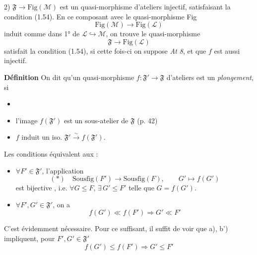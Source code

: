 \documentclass[11pt,a4paper]{article}
\begin{document}
2) $\boxed{\mathfrak{F} \to \mathrm{Fig}(\mathcal{M})}$ est un quasi-morphisme d'ateliers injectif, satisfaisant la condition  (1.54). \add{\ill{}} En ce composant avec le quasi-morphisme Fig
\[
  \mathrm{Fig}(\mathcal{M}) \longrightarrow \mathrm{Fig}(\mathcal{L})
\]
induit comme dans 1° de $\mathcal{L} \hookrightarrow \mathcal{M}$, on trouve le quasi-morphisme
\[
  \mathfrak{F} \longrightarrow \mathrm{Fig}(\mathcal{L})
\]
  satisfait la condition  (1.54), si cette fois-ci on suppose \emph{At 8}, et \ill{} \ill{} que $f$ est aussi injectif.

\textbf{Définition} On dit qu'un quasi-morphisme $f : \mathfrak{F}' \to \mathfrak{F}$ d'ateliers est un \emph{plongement}, si
\begin{itemize}
  \item[] 
  \item[a)] l'image $f(\mathfrak{F}')$ est un sous-atelier de $\mathfrak{F}$ (p. 42)
  \item[b)] $f$ induit un iso. $\mathfrak{F}' \xrightarrow{\ \sim\ } f(\mathfrak{F}')$.
\end{itemize}
 Les conditions  équivalent \add{\ill{}} aux \ill{} \ill{} : 
\begin{itemize}
  \item[a')] $\forall F' \in \mathfrak{F}'$, l'application
  \[
    (*) \quad \mathrm{Sousfig}(F') \longrightarrow \mathrm{Sousfig}(F), \qquad G' \longmapsto f(G')
  \]
  est bijective  , i.e. $\forall G \leq F$, $\exists\, G' \leq F'$ telle que $G = f(G')$.
  \item[b')] $\forall F', G' \in \mathfrak{F}'$, on a
  \[
    f(G') \ll f(F') \Longrightarrow G' \ll F'
  \]
\end{itemize}


C'est évidemment nécessaire. Pour ce suffisant, \struck{\ill{}} il suffit de voir que  a), b') impliquent, pour $F', G' \in \mathfrak{F}'$
\[
  f(G') \leq f(F') \Longrightarrow G' \leq F'
\]
\end{document}
